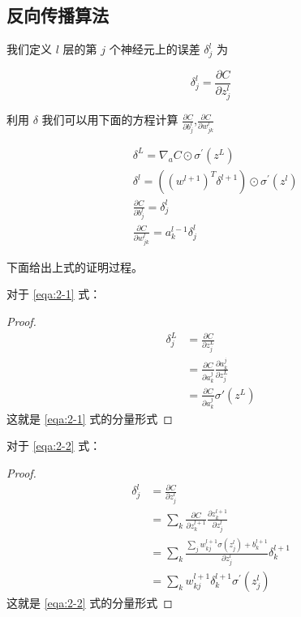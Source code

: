 \documentclass{ctexart}
\numberwithin{equation}{section}    %
\begin{document}
\subsection{反向传播算法}
我们定义 $l$ 层的第 $j$ 个神经元上的误差 $\delta^l_j$ 为

\begin{equation}
    \delta_j^l=\frac{\partial C}{\partial z_j^l}
\end{equation}

利用 $\delta$ 我们可以用下面的方程计算 $\frac{\partial C}{\partial b_{j}^{l}}$,$\frac{\partial C}{\partial w_{j k}^{l}}$

\begin{subequations}
    \label{eqa:2}
    \begin{align}
    & \delta^{L}=\nabla_{a} C \odot \sigma^{\prime}\left(z^{L}\right) \label{eqa:2-1}\\
    & \delta^{l}=\left(\left(w^{l+1}\right)^{T} \delta^{l+1}\right) \odot \sigma^{\prime}\left(z^{l}\right) \label{eqa:2-2}\\
    & \frac{\partial C}{\partial b_{j}^{l}}=\delta_{j}^{l} \label{eqa:2-3}\\
    & \frac{\partial C}{\partial w_{j k}^{l}}=a_{k}^{l-1} \delta_{j}^{l} \label{eqa:2-4}
    \end{align}
\end{subequations}

下面给出上式的证明过程。

对于 \eqref{eqa:2-1} 式：
\begin{proof}
    \begin{equation}
        \begin{aligned}
            \delta_j^L&=\frac{\partial C}{\partial z_j^L}\\
            &=\frac{\partial C}{\partial a_k^j}\frac{\partial a_k^j}{\partial z_j^L}\\
            &=\frac{\partial C}{\partial a_k^j}\sigma'(z^L)
        \end{aligned}
    \end{equation}
    这就是 \eqref{eqa:2-1} 式的分量形式
\end{proof}

对于 \eqref{eqa:2-2} 式：
\begin{proof}
    \begin{equation}
        \begin{aligned}
            \delta_{j}^{l} &=\frac{\partial C}{\partial z_{j}^{l}} \\
            &=\sum_{k} \frac{\partial C}{\partial z_{k}^{l+1}} \frac{\partial z_{k}^{l+1}}{\partial z_{j}^{l}} \\
            &=\sum_{k} \frac{\sum_{j} w_{k j}^{l+1} \sigma\left(z_{j}^{l}\right)+b_{k}^{l+1}}{\partial z_j^l}\delta_k^{l+1}\\
            &=\sum_{k} w_{k j}^{l+1} \delta_{k}^{l+1} \sigma^{\prime}\left(z_{j}^{l}\right)
        \end{aligned}
    \end{equation}
    这就是 \eqref{eqa:2-2} 式的分量形式
\end{proof}
\end{document}

